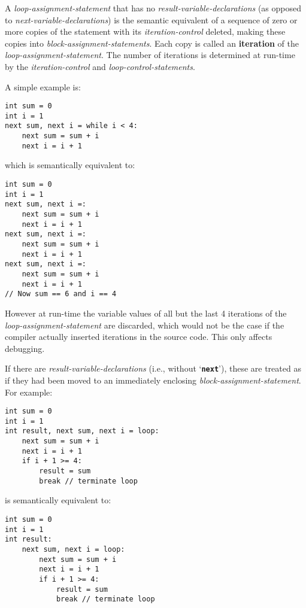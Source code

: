 \documentclass[12pt]{article}
\newcommand{\TT}[1]{{\tt \bfseries #1}}
\newcommand{\key}[1]{{\rm \bfseries #1}}
\newenvironment{indpar}[1][0.3in]%
	{\begin{list}{}%
		     {\setlength{\itemsep}{0in}%
		      \setlength{\topsep}{0in}%
		      \setlength{\parsep}{1ex}%
		      \setlength{\labelwidth}{#1}%
		      \setlength{\leftmargin}{#1}%
		      \addtolength{\leftmargin}{\labelsep}}%
	 \item}%
	{\end{list}}
\begin{document}
A {\em loop-assignment-statement} that has no {\em result-variable-declarations}
(as opposed to {\em next-variable-declarations})
is the semantic equivalent of
a sequence of zero or more copies of the statement with
its {\em iteration-control} deleted, making these copies into
{\em block-assignment-statements}.  Each copy is called an
\key{iteration} of the {\em loop-assignment-statement}.
The number of iterations is
determined at run-time by the {\em iteration-control}
and {\em loop-control-statements}.

A simple example is:
\begin{indpar}\begin{verbatim}
int sum = 0
int i = 1
next sum, next i = while i < 4:
    next sum = sum + i
    next i = i + 1
\end{verbatim}\end{indpar}
which is semantically equivalent to:
\begin{indpar}\begin{verbatim}
int sum = 0
int i = 1
next sum, next i =:
    next sum = sum + i
    next i = i + 1
next sum, next i =:
    next sum = sum + i
    next i = i + 1
next sum, next i =:
    next sum = sum + i
    next i = i + 1
// Now sum == 6 and i == 4
\end{verbatim}\end{indpar}

However at run-time the variable values of all but the
last 4 iterations of the {\em loop-assignment-statement}
are discarded, which would not be the case if the compiler
actually inserted iterations in the source code.
This only affects debugging.

If there are {\em result-variable-declarations} (i.e., without
`\TT{next}'), these are
treated as if they had been moved to an immediately enclosing
{\em block-assignment-statement}.  For example:
\begin{indpar}\begin{verbatim}
int sum = 0
int i = 1
int result, next sum, next i = loop:
    next sum = sum + i
    next i = i + 1
    if i + 1 >= 4:
        result = sum
        break // terminate loop
\end{verbatim}\end{indpar}
is semantically equivalent to:
\begin{indpar}\begin{verbatim}
int sum = 0
int i = 1
int result:
    next sum, next i = loop:
        next sum = sum + i
        next i = i + 1
        if i + 1 >= 4:
            result = sum
            break // terminate loop
\end{verbatim}\end{indpar}
\end{document}
